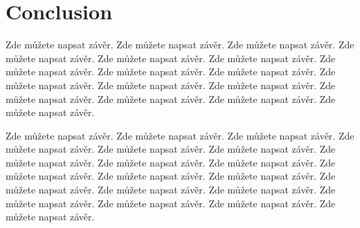 \chapter*{Conclusion}

Zde můžete napsat závěr. Zde můžete napsat závěr. Zde můžete napsat závěr. Zde můžete napsat závěr. Zde můžete napsat
závěr. Zde můžete napsat závěr. Zde můžete napsat závěr. Zde můžete napsat závěr. Zde můžete napsat závěr. Zde můžete
napsat závěr. Zde můžete napsat závěr. Zde můžete napsat závěr. Zde můžete napsat závěr. Zde můžete napsat závěr. Zde
můžete napsat závěr. Zde můžete napsat závěr.

Zde můžete napsat závěr. Zde můžete napsat závěr. Zde můžete napsat závěr. Zde můžete napsat závěr. Zde můžete napsat
závěr. Zde můžete napsat závěr. Zde můžete napsat závěr. Zde můžete napsat závěr. Zde můžete napsat závěr. Zde můžete
napsat závěr. Zde můžete napsat závěr. Zde můžete napsat závěr. Zde můžete napsat závěr. Zde můžete napsat závěr. Zde
můžete napsat závěr. Zde můžete napsat závěr. Zde můžete napsat závěr. Zde můžete napsat závěr. Zde můžete napsat závěr.


\lipsum[50-65]
